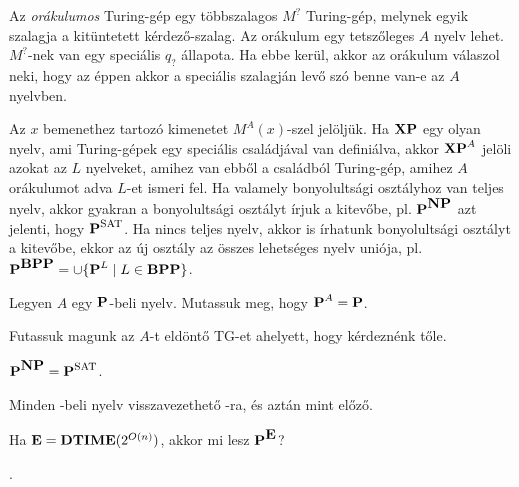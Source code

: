 
\bigskip
{} Az {\em orákulumos} Turing-gép egy többszalagos $M^?$ Turing-gép, melynek egyik szalagja a kitüntetett kérdez\H o-szalag. Az orákulum egy tetsz\H oleges $A$ nyelv lehet. $M^?$-nek van egy speciális $q_?$ állapota. Ha ebbe kerül, akkor az orákulum válaszol neki, hogy az éppen akkor a speciális szalagján lev\H o szó benne van-e az $A$ nyelvben. 

Az $x$ bemenethez tartozó kimenetet $M^A(x)$-szel jelöljük. Ha $\XP$ egy olyan nyelv, ami Turing-gépek egy speci\'alis családj\'aval van defini\'alva, akkor $\XP^A$ jelöli azokat az $L$ nyelveket, amihez van ebb\H ol a csal\'adb\'ol Turing-g\'ep, amihez $A$ orákulumot adva $L$-et ismeri fel. Ha valamely bonyolults\'agi oszt\'alyhoz van teljes nyelv, akkor gyakran a bonyolults\'agi oszt\'alyt \'irjuk a kitev\H obe, pl. $\P^{\NP}$ azt jelenti, hogy $\P^{\SAT}$. Ha nincs teljes nyelv, akkor is \'irhatunk bonyolults\'agi oszt\'alyt a kitev\H obe, ekkor az \'uj oszt\'aly az \"osszes lehets\'eges nyelv uni\'oja, pl.\ $\P^{\BPP}=\cup \{\P^{L}\mid {L\in \BPP}\}$.

\begin{Exercise}[counter={sorszam}, difficulty=0]
	Legyen $A$ egy $\P$-beli nyelv. Mutassuk meg, hogy $\P^A=\P$.
\end{Exercise}	
\begin{Answer}
	Futassuk magunk az $A$-t eld\"ont\H o TG-et ahelyett, hogy k\'erdezn\'enk t\H ole.
\end{Answer}


\begin{Exercise}[counter={sorszam}, difficulty=0]
	$\P^{\NP}=\P^{\SAT}$.
\end{Exercise}	
\begin{Answer}
	Minden \NP-beli nyelv visszavezethet\H o \SAT-ra, \'es azt\'an mint el\H oz\H o.
\end{Answer}


\begin{Exercise}[counter={sorszam}, difficulty=0]
	Ha $\E=\DTIME(2^{O(n)})$, akkor mi lesz $\P^{\E}$?
\end{Exercise}	
\begin{Answer}
	\EXP.
\end{Answer}


